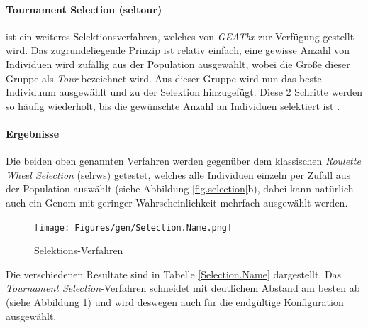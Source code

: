 \paragraph{Tournament Selection (seltour)} ist ein weiteres Selektionsverfahren,
welches von \emph{GEATbx} zur Verfügung gestellt wird. Das zugrundeliegende
Prinzip ist relativ einfach, eine gewisse Anzahl von Individuen wird zufällig
aus der Population ausgewählt, wobei die Größe dieser Gruppe als \emph{Tour}
bezeichnet wird. Aus dieser Gruppe wird nun das beste Individuum ausgewählt und
zu der Selektion hinzugefügt. Diese 2 Schritte werden so häufig wiederholt, bis
die gewünschte Anzahl an Individuen selektiert ist \citep{seltour}.


\paragraph{Ergebnisse} Die beiden oben genannten Verfahren werden gegenüber dem
klassischen \emph{Roulette Wheel Selection} (selrws) getestet, welches alle
Individuen einzeln per Zufall aus der Population auswählt (siehe Abbildung
\ref{fig.selection}b), dabei kann natürlich
auch ein Genom mit geringer Wahrscheinlichkeit mehrfach ausgewählt werden.



\begin{figure}[h!]
  \centering
  \texttt{[image: Figures/gen/Selection.Name.png]}
  \caption{Selektions-Verfahren}\label{fig.selectionname}
\end{figure}

\noindent Die verschiedenen Resultate sind in Tabelle \ref{Selection.Name}
dargestellt. Das \emph{Tournament Selection}-Verfahren schneidet mit deutlichem
Abstand am besten ab (siehe Abbildung \ref{fig.selectionname}) und wird deswegen
auch für die endgültige Konfiguration ausgewählt.

